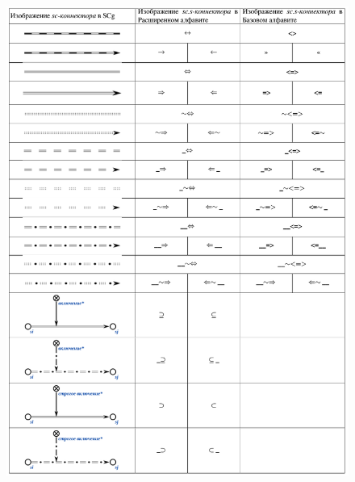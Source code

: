 \begin{figure}[h]
	\centering
	\includegraphics[scale=0.5]{images/intro/scs_non_membership_connectors_1.png}
\end{figure}

